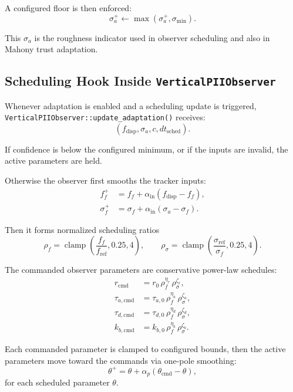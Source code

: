 \documentclass[conference]{IEEEtran}
\DeclareMathOperator{\clamp}{clamp}
\begin{document}
A configured floor is then enforced:
\begin{equation}
\sigma_a^{+} \leftarrow \max(\sigma_a^{+}, \sigma_{\min}).
\end{equation}

This \(\sigma_a\) is the roughness indicator used in observer scheduling and
also in Mahony trust adaptation.

\subsection{Scheduling Hook Inside \texttt{VerticalPIIObserver}}

Whenever adaptation is enabled and a scheduling update is triggered,
\texttt{VerticalPIIObserver::update\_adaptation()} receives:
\begin{equation}
(f_{\mathrm{disp}},\sigma_a,c,dt_{\mathrm{sched}}).
\end{equation}

If confidence is below the configured minimum, or if the inputs are invalid,
the active parameters are held.

Otherwise the observer first smooths the tracker inputs:
\begin{align}
f_f^{+} &= f_f + \alpha_{\mathrm{in}}(f_{\mathrm{disp}}-f_f),\\
\sigma_f^{+} &= \sigma_f + \alpha_{\mathrm{in}}(\sigma_a-\sigma_f).
\end{align}

Then it forms normalized scheduling ratios
\begin{equation}
\rho_f = \clamp\!\left(\frac{f_f}{f_{\mathrm{ref}}},0.25,4\right),
\qquad
\rho_\sigma = \clamp\!\left(\frac{\sigma_{\mathrm{ref}}}{\sigma_f},0.25,4\right).
\end{equation}

The commanded observer parameters are conservative power-law schedules:
\begin{align}
r_{\mathrm{cmd}} &=
r_0\,\rho_f^{\eta_r}\,\rho_\sigma^{\zeta_r},\\
\tau_{a,\mathrm{cmd}} &=
\tau_{a,0}\,\rho_f^{\eta_a}\,\rho_\sigma^{\zeta_a},\\
\tau_{d,\mathrm{cmd}} &=
\tau_{d,0}\,\rho_f^{\eta_d}\,\rho_\sigma^{\zeta_d},\\
k_{b,\mathrm{cmd}} &=
k_{b,0}\,\rho_f^{\eta_b}\,\rho_\sigma^{\zeta_b}.
\end{align}

Each commanded parameter is clamped to configured bounds, then the active
parameters move toward the commands via one-pole smoothing:
\begin{equation}
\theta^{+}
=
\theta + \alpha_p(\theta_{\mathrm{cmd}}-\theta),
\end{equation}
for each scheduled parameter \(\theta\).
\end{document}

